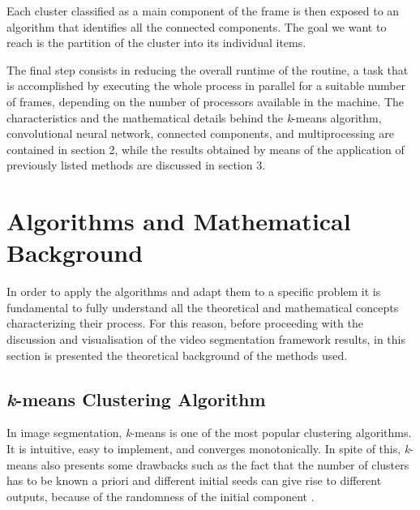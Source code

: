 \documentclass{usiinftr}
\begin{document}
 Each cluster classified as a main component of the frame is then exposed to an algorithm that identifies all the connected components. The goal we want to reach is the partition of the cluster into its individual items.
 
 The final step consists in reducing the overall runtime of the routine, a task that is accomplished by executing the whole process in parallel for a suitable number of frames, depending on the number of processors available in the machine.
 The characteristics and the mathematical details behind the \textit{k}-means algorithm, convolutional neural network, connected components, and multiprocessing are contained in section 2, while the results obtained by means of the application of previously listed methods are discussed in section 3.
 
\section{Algorithms and Mathematical Background}
In order to apply the algorithms and adapt them to a specific problem it is fundamental to fully understand all the theoretical and mathematical concepts characterizing their process. For this reason, before proceeding with the discussion and visualisation of the video segmentation framework results, in this section is presented the theoretical background of the methods used.

\subsection{\textit{k}-means Clustering Algorithm} 
In image segmentation, \textit{k}-means is one of the most popular clustering algorithms. It is intuitive, easy to implement, and converges monotonically. In spite of this, \textit{k}-means also presents some drawbacks such as the fact that the number of clusters has to be known a priori and different initial seeds can give rise to different outputs, because of the randomness of the initial component \cite{10}.
\end{document}
